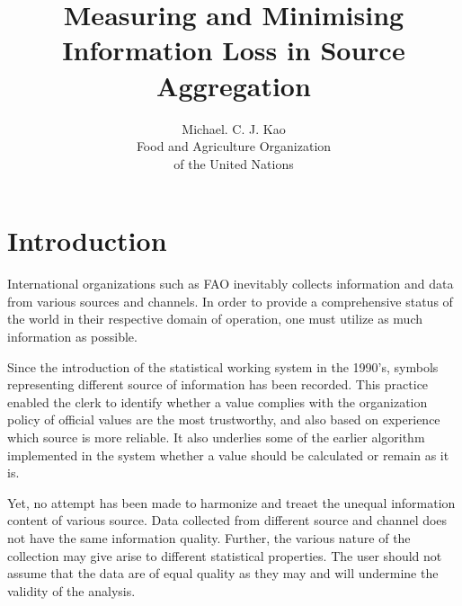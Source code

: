 \documentclass[nojss]{jss}
\title{\bf Measuring and Minimising Information Loss in Source Aggregation}
\author{Michael. C. J. Kao\\ Food and Agriculture Organization \\ of
  the United Nations}
\begin{document}
\section{Introduction}









International organizations such as FAO inevitably collects
information and data from various sources and channels. In order to
provide a comprehensive status of the world in their respective domain
of operation, one must utilize as much information as possible.


Since the introduction of the statistical working system in the
1990's, symbols representing different source of information has been
recorded. This practice enabled the clerk to identify whether a value
complies with the organization policy of official values are the most
trustworthy, and also based on experience which source is more
reliable. It also underlies some of the earlier algorithm implemented
in the system whether a value should be calculated or remain as it is.


Yet, no attempt has been made to harmonize and treaet the unequal
information content of various source. Data collected from different
source and channel does not have the same information
quality. Further, the various nature of the collection may give arise
to different statistical properties. The user should not assume that
the data are of equal quality as they may and will undermine the
validity of the analysis.
\end{document}
